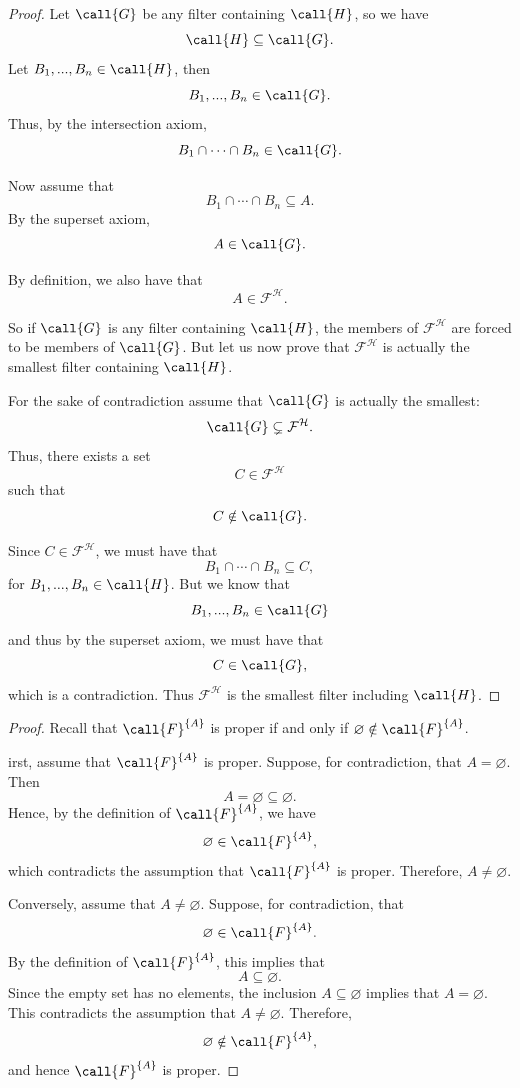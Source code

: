 {\begin{proof}
Let \(\call{G}\) be any filter containing \(\call{H}\), so we have
\[
\call{H} \subseteq \call{G}.
\]
Let \(B_1,...,B_n \in \call{H}\), then
\[
B_1,...,B_n \in \call{G}.
\]
Thus, by the intersection axiom,
\[
B_1 \cap \cdots \cap B_n \in \call{G}.
\]

Now assume that
\[
B_1 \cap \cdots \cap B_n \subseteq A.
\]
By the superset axiom,
\[
A \in \call{G}.
\]

By definition, we also have that
\[
A \in \mathcal{F}^{\mathcal H}.
\]

So if \(\call{G}\) is any filter containing \(\call{H}\), the members of
\(\mathcal{F}^{\mathcal H}\) are forced to be members of \(\call{G}\). But
let us now prove that \(\mathcal{F}^{\mathcal H}\) is actually the smallest
filter containing \(\call{H}\).

For the sake of contradiction assume that \(\call{G}\) is actually the
smallest:
\[
\call{G} \subsetneq \mathcal{F}^{\mathcal H}.
\]
Thus, there exists a set
\[
C \in \mathcal{F}^{\mathcal H}
\]
such that
\[
C \notin \call{G}.
\]

Since \(C \in \mathcal{F}^{\mathcal H}\), we must have that
\[
B_1 \cap \cdots \cap B_n \subseteq C,
\]
for \(B_1,...,B_n \in \call{H}\). But we know that
\[
B_1,...,B_n \in \call{G}
\]
and thus by the superset axiom, we must have that
\[
C \in \call{G},
\]
which is a contradiction. Thus \(\mathcal{F}^{\mathcal H}\) is the smallest
filter including \(\call{H}\).
\end{proof}


\begin{proof}
Recall that \(\call{F}^{\{A\}}\) is proper if and only if
\(\varnothing \notin \call{F}^{\{A\}}\).

irst, assume that \(\call{F}^{\{A\}}\) is proper. Suppose, for
contradiction, that \(A=\varnothing\). Then
\[
A=\varnothing\subseteq\varnothing.
\]
Hence, by the definition of \(\call{F}^{\{A\}}\), we have
\[
\varnothing\in \call{F}^{\{A\}},
\]
which contradicts the assumption that \(\call{F}^{\{A\}}\) is proper.
Therefore, \(A\neq\varnothing\).

Conversely, assume that \(A\neq\varnothing\). Suppose, for
contradiction, that
\[
\varnothing\in \call{F}^{\{A\}}.
\]
By the definition of \(\call{F}^{\{A\}}\), this implies that
\[
A\subseteq\varnothing.
\]
Since the empty set has no elements, the inclusion
\(A\subseteq\varnothing\) implies that \(A=\varnothing\). This
contradicts the assumption that \(A\neq\varnothing\). Therefore,
\[
\varnothing\notin \call{F}^{\{A\}},
\]
and hence \(\call{F}^{\{A\}}\) is proper.
\end{proof}

}
